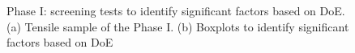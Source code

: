 \documentclass[
  12pt]{article}
\begin{document}
\begin{figure}

{\centering {}\newline{}

}

\caption{Phase I: screening tests to identify significant factors based on DoE. (a) Tensile sample of the Phase I. (b) Boxplots to identify significant factors based on DoE}\label{fig:fase1}
\end{figure}

\providecommand{\docline}[3]{\noalign{\global\setlength{\arrayrulewidth}{#1}}\arrayrulecolor[HTML]{#2}\cline{#3}}

\setlength{\tabcolsep}{2pt}

\renewcommand*{\arraystretch}{1.5}
\end{document}
